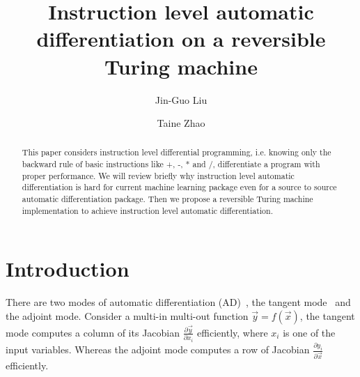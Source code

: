 \documentclass[aps,twocolumn,longbibliography,english,superscriptaddress,prr]{revtex4-1}
\newcommand{\<}{\langle}
\renewcommand{\>}{\rangle}
\newcommand{\vx}{{\vec x}}
\newcommand{\vy}{{\vec y}}
\theoremstyle{definition}\newtheorem{definition}{\textit{Definition}}
\begin{document}
\title{Instruction level automatic differentiation on a reversible Turing machine}


\author{Jin-Guo Liu}

\author{Taine Zhao}

\begin{abstract}
    This paper considers instruction level differential programming, i.e. knowing only the backward rule of basic instructions like +, -, * and /, differentiate a program with proper performance. We will review briefly why instruction level automatic differentiation is hard for current machine learning package even for a source to source automatic differentiation package. Then we propose a reversible Turing machine implementation to achieve instruction level automatic differentiation.
\end{abstract}


\maketitle

\section{Introduction}\label{sec:intro}
    There are two modes of automatic differentiation (AD)~\cite{Hascoet2013}, the tangent mode~\cite{Revels2016} and the adjoint mode.
    Consider a multi-in multi-out function $\vy = f(\vx)$, the tangent mode computes a column of its Jacobian $\frac{\partial \vy}{\partial x_i}$ efficiently, where $x_i$ is one of the input variables.
Whereas the adjoint mode computes a row of Jacobian $\frac{\partial y_i}{\partial \vec{x}}$ efficiently.
\end{document}
